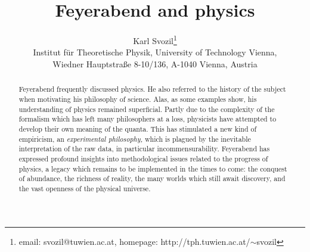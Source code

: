 \documentclass{article}
\begin{document}
\title{Feyerabend and physics}
\author{Karl Svozil\footnote{email: svozil@tuwien.ac.at, homepage: http://tph.tuwien.ac.at/$\sim$svozil}\\
Institut f\"ur Theoretische Physik, University of Technology Vienna, \\
Wiedner Hauptstra\ss e 8-10/136, A-1040 Vienna, Austria}

\maketitle

\begin{abstract}
Feyerabend frequently discussed physics.
He also referred to the history of the subject when motivating his philosophy of science.
Alas, as some examples show, his understanding of physics remained superficial.
Partly due to the complexity of the formalism which has left many philosophers at a loss,
physicists have attempted to develop their own meaning of the quanta.
This has stimulated a new kind of empiricism, an {\em experimental philosophy,}
which is plagued by the inevitable interpretation of the raw data, in particular incommensurability.
Feyerabend has expressed profound insights into methodological issues related to the progress of physics, a legacy which remains to be implemented in the times to come:
the conquest of abundance, the richness of reality,
the many worlds which still await discovery,
and the vast openness of the physical universe.
\end{abstract}
\end{document}
